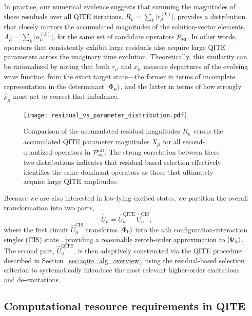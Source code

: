 \documentclass[aip,jcp,amsmath,amssymb, reprint]{revtex4-1}
\begin{document}
In practice, our numerical evidence suggests that summing the magnitudes of these residuals over all QITE iterations, 
$R_\mu = \sum_{k} \bigl|r_\mu^{(k)}\bigr|$,
provides a distribution that closely mirrors the accumulated magnitudes of the solution-vector elements,
$A_\mu = \sum_{k} \bigl| \alpha_\mu^{(k)}\bigr|$,
for the same set of candidate operators $\mathcal{P}_{\rm{sq}}$. In other words, operators that consistently exhibit large residuals also acquire large QITE parameters across the imaginary time evolution. Theoretically, this similarity can be rationalized by noting that both $r_\mu$ and $x_\mu$ measure departures of the evolving wave function from the exact target state---the former in terms of incomplete representation in the determinant $\ket{\Phi_\mu}$, and the latter in terms of how strongly $\hat{\rho}_\mu$ must act to correct that imbalance.

\begin{figure}[h!]
\centering
\texttt{[image: residual\_vs\_parameter\_distribution.pdf]}
\caption{Comparison of the accumulated residual magnitudes $R_\mu$ versus the accumulated QITE parameter magnitudes $X_\mu$ for all second-quantized operators in $\mathcal{P}_{\rm{sq}}^{\rm{all}}$. The strong correlation between these two distributions indicates that residual-based selection effectively identifies the same dominant operators as those that ultimately acquire large QITE amplitudes.}
\label{fig:residual_param_comparison}
\end{figure}

Because we are also interested in low-lying excited states, we partition the overall transformation into two parts, 
\[
\hat{U}_n = \hat{U}_n^{\mathrm{QITE}} \, \hat{U}_n^{\mathrm{CIS}},
\]
where the first circuit $\hat{U}_n^{\mathrm{CIS}}$ transforms $\ket{\Phi_0}$ into the $n$th configuration-interaction singles (CIS) state \cite{}, providing a reasonable zeroth-order approximation to $\ket{\Psi_n}$. The second part, $\hat{U}_n^{\mathrm{QITE}}$, is then adaptively constructed via the QITE procedure described in Section~\ref{sec:aqite_alg_overview}, using the residual-based selection criterion to systematically introduce the most relevant higher-order excitations and de-excitations.


\subsection{Computational resource requirements in QITE}
\label{sec:computational_req}
\end{document}
